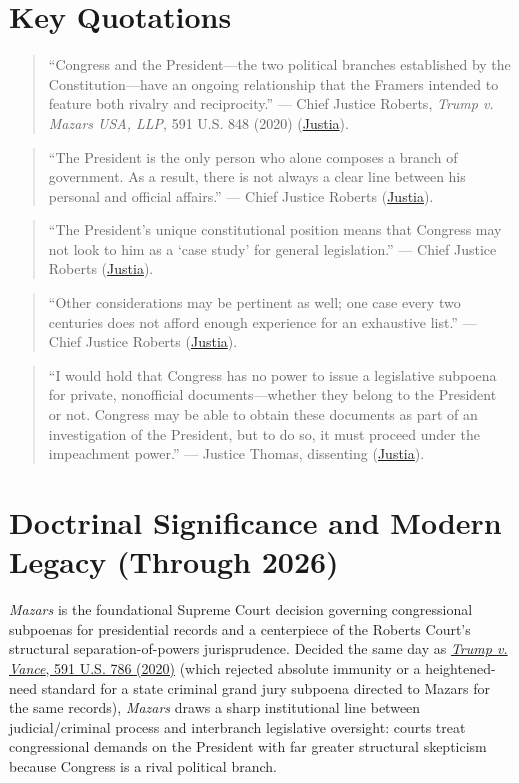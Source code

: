 \documentclass[12pt]{article}
\begin{document}
\section{Key Quotations}
\begin{quote}
``Congress and the President---the two political branches established by the Constitution---have an ongoing relationship that the Framers intended to feature both rivalry and reciprocity.'' --- Chief Justice Roberts, \textit{Trump v. Mazars USA, LLP}, 591 U.S. 848 (2020) (\href{https://supreme.justia.com/cases/federal/us/591/19-715/}{Justia}).
\end{quote}
\begin{quote}
``The President is the only person who alone composes a branch of government. As a result, there is not always a clear line between his personal and official affairs.'' --- Chief Justice Roberts (\href{https://supreme.justia.com/cases/federal/us/591/19-715/}{Justia}).
\end{quote}
\begin{quote}
``The President's unique constitutional position means that Congress may not look to him as a `case study' for general legislation.'' --- Chief Justice Roberts (\href{https://supreme.justia.com/cases/federal/us/591/19-715/}{Justia}).
\end{quote}
\begin{quote}
``Other considerations may be pertinent as well; one case every two centuries does not afford enough experience for an exhaustive list.'' --- Chief Justice Roberts (\href{https://supreme.justia.com/cases/federal/us/591/19-715/}{Justia}).
\end{quote}
\begin{quote}
``I would hold that Congress has no power to issue a legislative subpoena for private, nonofficial documents---whether they belong to the President or not. Congress may be able to obtain these documents as part of an investigation of the President, but to do so, it must proceed under the impeachment power.'' --- Justice Thomas, dissenting (\href{https://supreme.justia.com/cases/federal/us/591/19-715/}{Justia}).
\end{quote}

\section{Doctrinal Significance and Modern Legacy (Through 2026)}
\textit{Mazars} is the foundational Supreme Court decision governing congressional subpoenas for presidential records and a centerpiece of the Roberts Court's structural separation-of-powers jurisprudence. Decided the same day as \href{https://www.law.cornell.edu/supremecourt/text/19-635}{\textit{Trump v. Vance}, 591 U.S. 786 (2020)} (which rejected absolute immunity or a heightened-need standard for a state criminal grand jury subpoena directed to Mazars for the same records), \textit{Mazars} draws a sharp institutional line between judicial/criminal process and interbranch legislative oversight: courts treat congressional demands on the President with far greater structural skepticism because Congress is a rival political branch.
\end{document}
